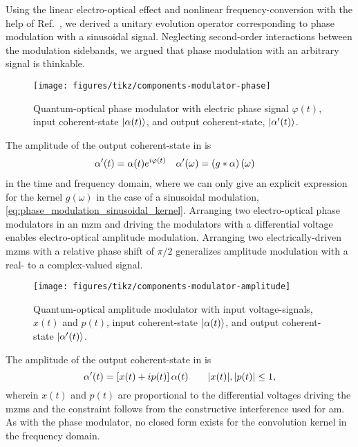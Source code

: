 Using the linear electro-optical effect and nonlinear frequency-conversion with the help of Ref.~\cite{Horoshko2018,QuesadaMejia2015}, we derived a unitary evolution operator corresponding to phase modulation with a sinusoidal signal.
Neglecting second-order interactions between the modulation sidebands, we argued that phase modulation with an arbitrary signal is thinkable.
\begin{figure}[htb]
    \centering
    \texttt{[image: figures/tikz/components-modulator-phase]}
    \caption{Quantum-optical phase modulator with electric phase signal $\varphi(t)$, input coherent-state $\lvert\alpha(t)\rangle$, and output coherent-state, $\lvert\alpha^\prime(t)\rangle$.}\label{fig:components_modulator_phase}
\end{figure}
The amplitude of the output coherent-state in  is
\begin{align}
	\alpha^\prime(t)
	&=
	\alpha(t)
	e^{i\varphi(t)}
	&
	\alpha^\prime(\omega)
	&=
	\left(g\ast\alpha\right)(\omega)
\end{align}
in the time and frequency domain, where we can only give an explicit expression for the kernel $g(\omega)$ in the case of a sinusoidal modulation, \cref{eq:phase_modulation_sinusoidal_kernel}.
Arranging two electro-optical phase modulators in an \gls{mzm} and driving the modulators with a differential voltage enables electro-optical amplitude modulation.
Arranging two electrically-driven \gls{mzm}s with a relative phase shift of $\pi/2$ generalizes amplitude modulation with a real- to a complex-valued signal.
\begin{figure}[htb]
    \centering
    \texttt{[image: figures/tikz/components-modulator-amplitude]}
    \caption{Quantum-optical amplitude modulator with input voltage-signals, $x(t)$ and $p(t)$, input coherent-state $\lvert\alpha(t)\rangle$, and output coherent-state $\lvert\alpha^\prime(t)\rangle$.}\label{fig:components_modulator_phase}
\end{figure}
The amplitude of the output coherent-state in  is
\begin{equation}
	\alpha^\prime(t)
	=
	\left[
		x(t)
		+
		ip(t)
	\right]
	\alpha(t)
	\qquad
	\lvert x(t)\rvert,
	\lvert p(t)\rvert
	\leq
	1
	,
\end{equation}
wherein $x(t)$ and $p(t)$ are proportional to the differential voltages driving the \gls{mzm}s and the constraint follows from the constructive interference used for \gls{am}.
As with the phase modulator, no closed form exists for the convolution kernel in the frequency domain.

